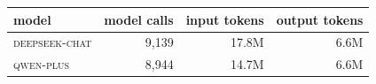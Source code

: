 \begin{tabular}{lrrr}
\toprule
model & model calls & input tokens & output tokens \\
\midrule
\textsc{deepseek-chat} & 9,139 & 17.8M & 6.6M \\
\textsc{qwen-plus} & 8,944 & 14.7M & 6.6M \\
\bottomrule
\end{tabular}
